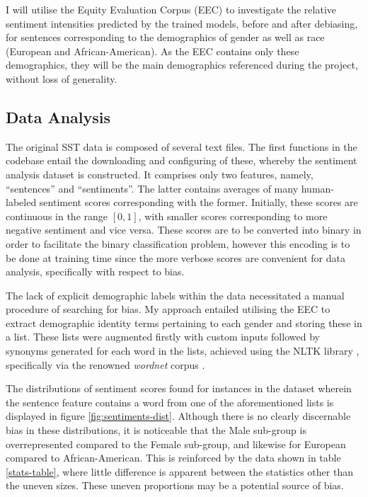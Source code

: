 \documentclass[a4paper]{IEEEtran}
\begin{document}
I will utilise the Equity Evaluation Corpus (EEC) \cite{b9} to investigate the relative sentiment intensities predicted by the trained models, before and after debiasing, for sentences corresponding to the demographics of gender as well as race (European and African-American). As the EEC contains only these demographics, they will be the main demographics referenced during the project, without loss of generality. %


\subsection{Data Analysis}

The original SST data is composed of several text files. The first functions in the codebase entail the downloading and configuring of these, whereby the sentiment analysis dataset is constructed. It comprises only two features, namely, ``sentences'' and ``sentiments''. The latter contains averages of many human-labeled sentiment scores corresponding with the former. Initially, these scores are continuous in the range $[0, 1]$, with smaller scores corresponding to more negative sentiment and vice versa. These scores are to be converted into binary in order to facilitate the binary classification problem, however this encoding is to be done at training time since the more verbose scores are convenient for data analysis, specifically with respect to bias.

The lack of explicit demographic labels within the data necessitated a manual procedure of searching for bias. My approach entailed utilising the EEC \cite{b9} to extract demographic identity terms pertaining to each gender and storing these in a list. These lists were augmented firstly with custom inputs followed by synonyms generated for each word in the lists, achieved using the NLTK library \cite{nltk}, specifically via the renowned \textit{wordnet} corpus \cite{wordnet}.  

The distributions of sentiment scores found for instances in the dataset wherein the sentence feature contains a word from one of the aforementioned lists is displayed in figure \ref{fig:sentiments-dist}. Although there is no clearly discernable bias in these distributions, it is noticeable that the Male sub-group is overrepresented compared to the Female sub-group, and likewise for European compared to African-American. This is reinforced by the data shown in table \ref{stats-table}, where little difference is apparent between the statistics other than the uneven sizes. These uneven proportions may be a potential source of bias.
\end{document}
